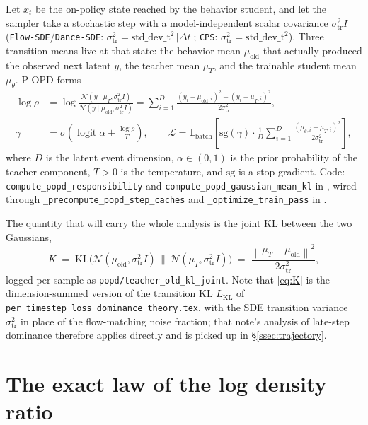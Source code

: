 \documentclass[11pt,a4paper]{article}
\newcommand{\E}{\mathbb{E}}
\newcommand{\norm}[1]{\left\lVert #1 \right\rVert}
\newcommand{\dt}{\Delta t}
\newcommand{\KL}{\mathrm{KL}}
\newcommand{\N}{\mathcal{N}}
\newcommand{\sgn}{\mathrm{sg}}
\newcommand{\str}{\sigma_{\mathrm{tr}}}
\newcommand{\muold}{\mu_{\mathrm{old}}}
\newcommand{\muT}{\mu_{T}}
\newcommand{\mus}{\mu_{\theta}}
\begin{document}
Let $x_t$ be the on-policy state reached by the behavior student, and let the sampler take a
stochastic step with a model-independent scalar covariance $\str^2 I$
(\texttt{Flow-SDE}/\texttt{Dance-SDE}: $\str^2=\mathrm{std\_dev\_t}^2\,\lvert\dt\rvert$;
\texttt{CPS}: $\str^2=\mathrm{std\_dev\_t}^2$). Three transition means live at that state: the
behavior mean $\muold$ that actually produced the observed next latent $y$, the teacher mean
$\muT$, and the trainable student mean $\mus$. P-OPD forms
\begin{align}
\log\rho &= \log\frac{\N(y\mid\muT,\str^2 I)}{\N(y\mid\muold,\str^2 I)}
          = \sum_{i=1}^{D}\frac{(y_i-\muold{}_{,i})^2-(y_i-\muT{}_{,i})^2}{2\str^2},
\label{eq:logrho}\\[0.3em]
\gamma &= \sigma\!\left(\operatorname{logit}\alpha + \frac{\log\rho}{T}\right),
\qquad
\mathcal{L} = \E_{\mathrm{batch}}\!\left[\sgn(\gamma)\cdot
  \frac{1}{D}\sum_{i=1}^{D}\frac{(\mus{}_{,i}-\muT{}_{,i})^2}{2\str^2}\right],
\label{eq:gate}
\end{align}
where $D$ is the latent event dimension, $\alpha\in(0,1)$ is the prior probability of the teacher
component, $T>0$ is the temperature, and $\sgn$ is a stop-gradient. Code: \texttt{compute\_popd\_responsibility} and
\texttt{compute\_popd\_gaussian\_mean\_kl} in
, wired through
\texttt{\_precompute\_popd\_step\_caches} and
\texttt{\_optimize\_train\_pass} in
.

The quantity that will carry the whole analysis is the joint KL between the two Gaussians,
\begin{equation}
K \;=\; \KL\big(\N(\muold,\str^2 I)\,\big\|\,\N(\muT,\str^2 I)\big)
  \;=\; \frac{\norm{\muT-\muold}^2}{2\str^2},
\label{eq:K}
\end{equation}
logged per sample as \texttt{popd/teacher\_old\_kl\_joint}. Note that \eqref{eq:K} is the
dimension-summed version of the transition KL $L_{\mathrm{KL}}$ of
\texttt{per\_timestep\_loss\_dominance\_theory.tex}, with the SDE transition variance
$\str^2$ in place of the flow-matching noise fraction; that note's analysis of late-step
dominance therefore applies directly and is picked up in \S\ref{ssec:trajectory}.

\section{The exact law of the log density ratio}
\label{sec:theory}
\end{document}

